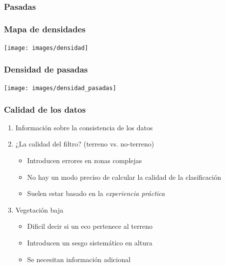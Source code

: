\begin{frame}
  \frametitle{Pasadas}
    \begin{center}
    \end{center}
\end{frame}
\begin{frame}
  \frametitle{Mapa de densidades}
    \begin{center}
      \texttt{[image: images/densidad]}
    \end{center}
\end{frame}
\begin{frame}
  \frametitle{Densidad de pasadas}
    \begin{center}
      \texttt{[image: images/densidad\_pasadas]}
    \end{center}
\end{frame}
\begin{frame}
  \frametitle{Calidad de los datos}
  \begin{enumerate}
    \item Información sobre la consistencia de los datos
    \item ¿La calidad del filtro? (terreno vs. no-terreno)
      \begin{itemize}
        \item Introducen errores en zonas complejas
        \item No hay un modo preciso de calcular la calidad de la clasificación
        \item Suelen estar basado en la \emph{\alert{experiencia práctica}}
      \end{itemize}
    \item Vegetación baja
      \begin{itemize}
        \item Dificil decir si un eco pertenece al terreno
        \item Introducen un \alert{sesgo sistemático} en altura
        \item Se necesitan información adicional
      \end{itemize}
  \end{enumerate}
\end{frame}
